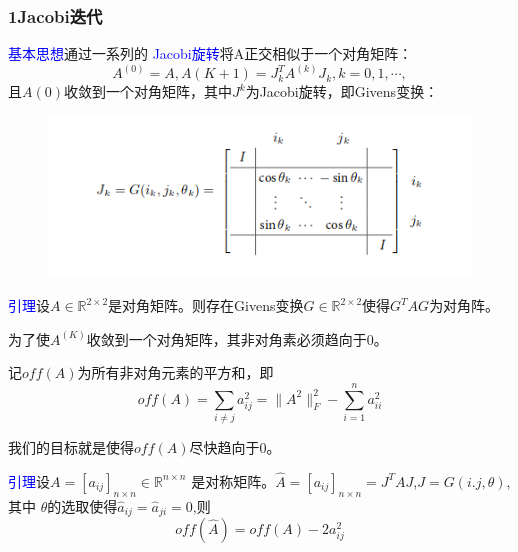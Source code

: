\documentclass[notheorems,serif]{beamer}
\begin{document}
\begin{frame}
\frametitle{1\qquad Jacobi迭代}

\textcolor{blue}{基本思想}\quad 通过一系列的 \textcolor{blue}{Jacobi旋转}将A正交相似于一个对角矩阵：
$$A^{(0)}=A,A{(K+1)}=J_k^TA^{(k)}J_k,k=0,1,\cdots,$$
且$A{(0)}$收敛到一个对角矩阵，其中$J^k$为Jacobi旋转，即Givens变换：

\begin{figure}[H]
	\centering
	\includegraphics[scale=0.7]{figurest/figure_1.png}
\end{figure}
\end{frame}
\begin{frame}
\textcolor{blue}{引理}\quad 设$A\in\mathbb{R}^{2\times 2}$是对角矩阵。则存在Givens变换$G\in \mathbb{R}^{2\times 2}$使得$G^TAG$为对角阵。
\end{frame}
\begin{frame}
为了使$A^{(K)}$收敛到一个对角矩阵，其非对角素必须趋向于0。

记$off(A)$为所有非对角元素的平方和，即
$$off(A)=\sum_{i\neq j}a_{ij}^2=\|A^2\|_F^2-\sum_{i=1}^na_{ii}^2$$

我们的目标就是使得$off(A)$尽快趋向于0。

\textcolor{blue}{引理}\quad 设$A=[a_{ij}]_{n\times n}\in \mathbb{R}^{n\times n}$
是对称矩阵。$\widehat{A}=[a_{ij}]_{n\times n}=J^TAJ$,$J=G(i.j,\theta)$,其中
$\theta$的选取使得$\widehat a_{ij}=\widehat a_{ji}=0$,则$$off(\widehat
A)=off(A)-2a_{ij}^2$$
\end{frame}
\end{document}
